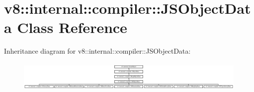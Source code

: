 \hypertarget{classv8_1_1internal_1_1compiler_1_1JSObjectData}{}\section{v8\+:\+:internal\+:\+:compiler\+:\+:J\+S\+Object\+Data Class Reference}
\label{classv8_1_1internal_1_1compiler_1_1JSObjectData}
Inheritance diagram for v8\+:\+:internal\+:\+:compiler\+:\+:J\+S\+Object\+Data\+:\begin{figure}[H]
\begin{center}
\leavevmode
\includegraphics[height=1.492537cm]{classv8_1_1internal_1_1compiler_1_1JSObjectData}
\end{center}
\end{figure}
